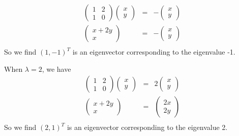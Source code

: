 \begin{eqnarray*}
\left(\begin{array}{cc}
1 & 2 \\
1 & 0
\end{array}\right)
\left(\begin{array}{c}
x \\
y
\end{array}\right) &=&
-
\left(\begin{array}{c}
x \\
y
\end{array}\right) \\
\left(\begin{array}{c}
x + 2y \\
x
\end{array}\right) &=&
-
\left(\begin{array}{c}
x \\
y
\end{array}\right) \\
\end{eqnarray*}
So we find $ (1, -1)^T $ is an eigenvector corresponding to the eigenvalue -1.

When $ \lambda = 2 $, we have
\begin{eqnarray*}
\left(\begin{array}{cc}
1 & 2 \\
1 & 0
\end{array}\right)
\left(\begin{array}{c}
x \\
y
\end{array}\right) &=&
2
\left(\begin{array}{c}
x \\
y
\end{array}\right) \\
\left(\begin{array}{c}
x + 2y \\
x
\end{array}\right) &=&
\left(\begin{array}{c}
2x \\
2y
\end{array}\right) \\
\end{eqnarray*}
So we find $ (2, 1)^T $ is an eigenvector corresponding to the eigenvalue 2.
